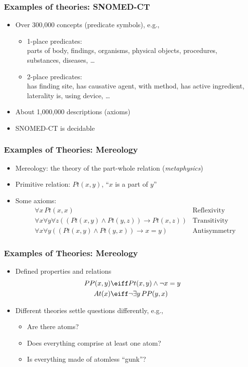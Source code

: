 \begin{frame}
    \frametitle{Examples of theories: SNOMED-CT}

\begin{itemize}
\item Over 300,000 concepts (predicate symbols), e.g.,\\
\begin{itemize}
\item 1-place predicates:\\
parts of body, findings, organisms, physical objects, procedures, substances, diseases, \dots
\item 2-place predicates:\\
has finding site, has causative agent, with method, has active ingredient, laterality is, using device, \dots
\end{itemize}
\item About 1,000,000 descriptions (axioms)
\item SNOMED-CT is decidable
\end{itemize}

\end{frame}

\begin{frame}
    \frametitle{Examples of Theories: Mereology}

\begin{itemize}
\item Mereology: the theory of the part-whole relation (\emph{metaphysics})
\item Primitive relation: $Pt(x, y)$, ``$x$ is a part of $y$''
\item Some axioms:
\begin{align*}
& \forall x\, Pt(x, x) & \text{Reflexivity}\\
& \forall x\forall y\forall z((Pt(x,y) \land Pt(y, z)) \to Pt(x,z)) & \text{Transitivity}\\
& \forall x\forall y((Pt(x, y) \land Pt(y, x)) \to x = y) & \text{Antisymmetry}
\end{align*}
\end{itemize}
\end{frame}

\begin{frame}
  \frametitle{Examples of Theories: Mereology}

\begin{itemize}
\item Defined properties and relations
\begin{align*}
PP(x, y) & \eiff Pt(x, y) \land \lnot x = y \\
At(x) & \eiff \lnot\exists y\,PP(y, x)
\end{align*}
\item Different theories settle questions differently, e.g.,
\begin{itemize}
\item Are there atoms?
\item Does everything comprise at least one atom?
\item Is everything made of atomless ``gunk''?
\end{itemize}
\end{itemize}

\end{frame}

